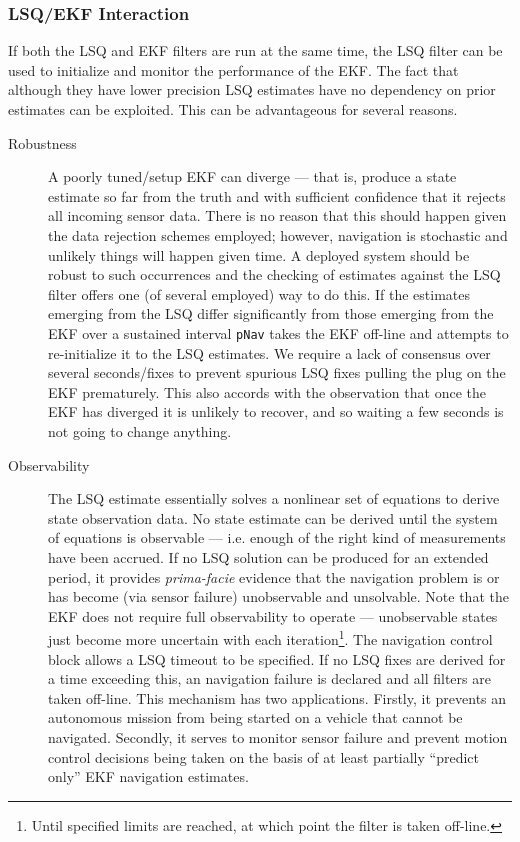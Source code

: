 \documentclass[a4paper,10pt]{article}
\newcommand{\Code}[1]{\texttt{#1} }
\newcommand{\code}[1]{\Code{#1} }
\begin{document}
\subsubsection{LSQ/EKF Interaction}
If both the LSQ and EKF filters are run at the same time, the LSQ
filter can be used to initialize and monitor the performance of
the EKF. The fact that although they have lower precision LSQ
estimates have no dependency on prior estimates can be exploited.
This can be advantageous for several reasons.

\begin{description}
\item [Robustness] A poorly tuned/setup EKF can diverge --- that is, produce a
state estimate so far from the truth and with sufficient confidence
that it rejects all incoming sensor data. There is no reason that
this should happen given the data rejection schemes employed;
however, navigation is stochastic and unlikely things will happen
given time. A deployed system should be robust to such occurrences
and the checking of estimates against the LSQ filter offers one (of
several employed) way to do this. If the estimates emerging from
the LSQ differ significantly from those emerging from the EKF over
a sustained interval \code{pNav} takes the EKF off-line and
attempts to re-initialize it to the LSQ estimates. We require a
lack of consensus over several seconds/fixes to prevent spurious
LSQ fixes pulling the plug on the EKF prematurely. This also
accords with the observation that once the EKF has diverged it is
unlikely to recover, and so waiting a few seconds is not going to
change anything.

\item[Observability] The LSQ estimate essentially solves a
nonlinear set of equations to derive state observation data. No
state estimate can be derived until the system of equations is
observable --- i.e. enough of the right kind of measurements have been
accrued. If no LSQ solution can be produced for an extended period,
it provides {\it{prima-facie}} evidence that the navigation
problem is or has become (via sensor failure) unobservable and
unsolvable. Note that the EKF does not require full observability
to operate --- unobservable states just become more uncertain with
each iteration\footnote{Until specified limits are reached, at
which point the filter is taken off-line.}. The navigation control
block allows a LSQ timeout to be specified. If no LSQ fixes are
derived for a time exceeding this, an navigation failure is
declared and all filters are taken off-line. This mechanism has two
applications. Firstly, it prevents an autonomous mission from being
started on a vehicle that cannot be navigated. Secondly, it serves
to monitor sensor failure and prevent motion control decisions
being taken on the basis of at least partially ``predict only''
EKF navigation estimates.


\end{description}
\end{document}
